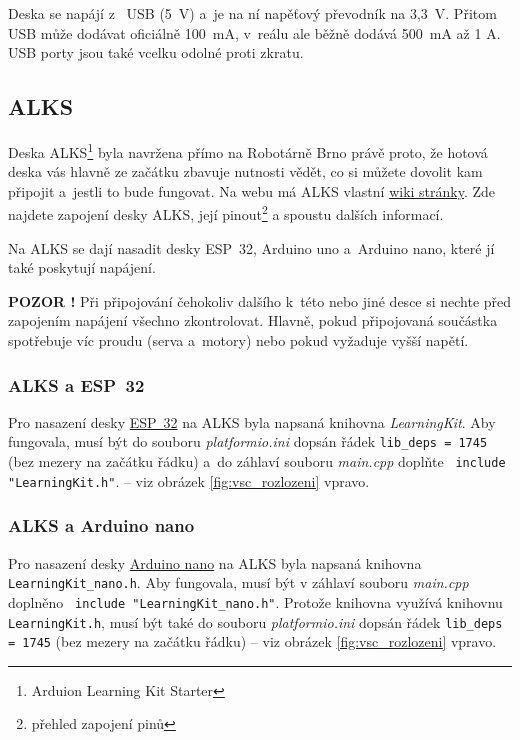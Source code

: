 Deska se napájí z~ USB (5~V) a~je na ní napěťový převodník
na 3,3~V. Přitom USB může dodávat oficiálně 100~mA, v~reálu ale běžně dodává 500~mA až 1 A. USB porty jsou také vcelku odolné proti zkratu.   

 \subsection{ALKS} \label{alks}  

Deska ALKS\footnote{Arduion Learning Kit Starter} byla navržena přímo na Robotárně Brno právě proto, že 
hotová deska   
vás hlavně ze začátku zbavuje nutnosti vědět, co si můžete dovolit kam připojit a~jestli to bude fungovat. 
Na webu má ALKS vlastní \href{https://github.com/RoboticsBrno/ArduinoLearningKitStarter/wiki}{wiki stránky}.
Zde najdete zapojení desky ALKS, její pinout\footnote{přehled zapojení pinů }  a spoustu dalších informací. 


Na ALKS se dají nasadit desky ESP~32, Arduino uno  a~Arduino nano, které jí také poskytují napájení.  

{\bf POZOR !} Při připojování čehokoliv dalšího k~této nebo jiné desce si nechte před zapojením napájení všechno zkontrolovat. Hlavně, pokud připojovaná součástka spotřebuje víc proudu (serva a~motory) nebo pokud vyžaduje vyšší napětí. 

\label{alks:knihovna} \subsubsection*{ALKS a ESP~32}

Pro nasazení desky   \hyperref[esp32]{ESP~32}
 na ALKS byla  napsaná knihovna {\it LearningKit}. 
Aby fungovala, musí být do souboru {\it platformio.ini} dopsán řádek 
{\tt lib\_deps = 1745} (bez mezery na začátku řádku) a~do záhlaví souboru {\it main.cpp} doplňte 
\verb| include "LearningKit.h"|.
 -- viz obrázek \ref{fig:vsc_rozlozeni} vpravo.

\label{alks:nano} \subsubsection*{ALKS a Arduino nano}

Pro nasazení desky   \hyperref[nano]{Arduino nano}  
na ALKS byla  napsaná knihovna \newline
{\tt LearningKit\_nano.h}. 
Aby fungovala, musí být v záhlaví souboru {\it main.cpp} doplněno
\verb| include "LearningKit_nano.h"|. Protože knihovna  využívá 
knihovnu {\tt LearningKit.h}, musí být také do souboru {\it platformio.ini} dopsán řádek {\tt lib\_deps = 1745} (bez mezery na začátku řádku)  -- viz obrázek \ref{fig:vsc_rozlozeni} vpravo.



